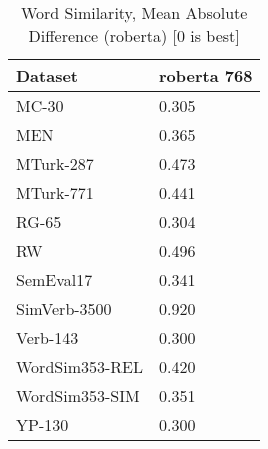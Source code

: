 \begin{table}[]
\centering
\begin{tabular}{l|l}
\hline
Dataset & roberta 768 \\
\hline
MC-30 & 0.305 \\ 
MEN & 0.365 \\ 
MTurk-287 & 0.473 \\ 
MTurk-771 & 0.441 \\ 
RG-65 & 0.304 \\ 
RW & 0.496 \\ 
SemEval17 & 0.341 \\ 
SimVerb-3500 & 0.920 \\ 
Verb-143 & 0.300 \\ 
WordSim353-REL & 0.420 \\ 
WordSim353-SIM & 0.351 \\ 
YP-130 & 0.300
\end{tabular}
\caption{Word Similarity, Mean Absolute Difference (roberta) [0 is best]}
\label{tab:similarity-roberta}
\end{table}
